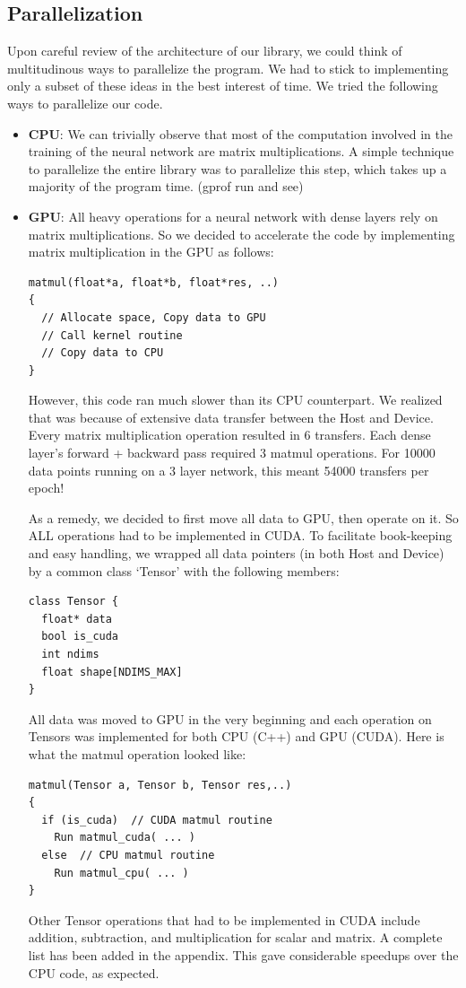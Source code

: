 \documentclass[conference]{IEEEtran}
\begin{document}
\subsection{Parallelization}
Upon careful review of the architecture of our library, we could think of multitudinous ways to parallelize the program. We had to stick to implementing only a subset of these ideas in the best interest of time. We tried the following ways to parallelize our code.
\begin{itemize}
    \item \textbf{CPU}: We can trivially observe that most of the computation involved in the training of the neural network are matrix multiplications. A simple technique to parallelize the entire library was to parallelize this step, which takes up a majority of the program time. (gprof run and see)
    \item \textbf{GPU}: All heavy operations for a neural network with dense layers rely on matrix multiplications. So we decided to accelerate the code by implementing matrix multiplication in the GPU as follows:

\begin{lstlisting}
matmul(float*a, float*b, float*res, ..) 
{
  // Allocate space, Copy data to GPU
  // Call kernel routine
  // Copy data to CPU
}
\end{lstlisting}

However, this code ran much slower than its CPU counterpart. We realized that was because of extensive data transfer between the Host and Device. Every matrix multiplication operation resulted in 6 transfers. Each dense layer's forward + backward pass required 3 matmul operations. For 10000 data points running on a 3 layer network, this meant 54000 transfers per epoch!

As a remedy, we decided to first move all data to GPU, then operate on it. So ALL operations had to be implemented in CUDA. To facilitate book-keeping and easy handling, we wrapped all data pointers (in both Host and Device) by a common class `Tensor' with the following members:

\begin{lstlisting}
class Tensor {
  float* data
  bool is_cuda
  int ndims
  float shape[NDIMS_MAX]
}
\end{lstlisting}

All data was moved to GPU in the very beginning and each operation on Tensors was implemented for both CPU (C++) and GPU (CUDA). Here is what the matmul operation looked like:

\begin{lstlisting}
matmul(Tensor a, Tensor b, Tensor res,..) 
{
  if (is_cuda)  // CUDA matmul routine
    Run matmul_cuda( ... )
  else  // CPU matmul routine
    Run matmul_cpu( ... )
}
\end{lstlisting}

Other Tensor operations that had to be implemented in CUDA include addition, subtraction, and multiplication for scalar and matrix. A complete list has been added in the appendix. This gave considerable speedups over the CPU code, as expected.
\end{itemize}
\end{document}
